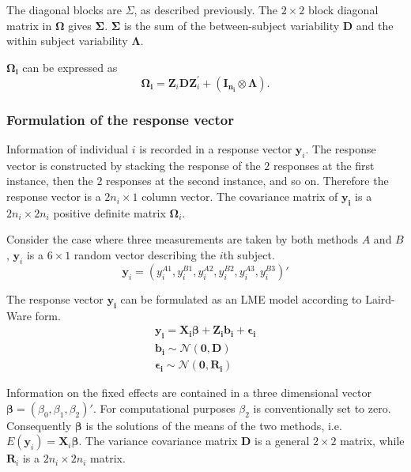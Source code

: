 \documentclass[12pt, a4paper]{report}
\theoremstyle{plain}
\theoremstyle{definition}
\theoremstyle{remark}
\begin{document}
	The diagonal blocks are $\Sigma$, as described previously. The $2 \times 2$ block diagonal matrix in $\boldsymbol{\Omega}$ gives $\boldsymbol{\Sigma}$. $\boldsymbol{\Sigma}$ is the sum of the between-subject variability $\boldsymbol{D}$ and the within subject variability $\boldsymbol{\Lambda}$.
	
	$\boldsymbol{\Omega_{i}}$ can be expressed as
	\[
	\boldsymbol{\Omega_{i}} = \boldsymbol{Z}_{i}\boldsymbol{D}\boldsymbol{Z}_{i}^\prime + ({\boldsymbol{I_{n_{i}}} \otimes \boldsymbol{\Lambda}}).
	\]
	
	
	\subsubsection{Formulation of the response vector}
	Information of individual $i$ is recorded in a response vector $\boldsymbol{y}_{i}$. The response vector is constructed by stacking the response of the $2$ responses at the first instance, then the $2$ responses at the second instance, and so on. Therefore the response vector is a $2n_{i} \times 1$ column vector.
	The covariance matrix of $\boldsymbol{y_{i}}$ is a $2n_{i} \times 2n_{i}$ positive definite matrix $\boldsymbol{\Omega}_{i}$.
	
	Consider the case where three measurements are taken by both methods $A$ and $B$, $\boldsymbol{y}_{i}$ is a $6 \times 1$ random vector describing the $i$th subject.
	\[
	\boldsymbol{y}_{i} = (y_{i}^{A1},y_{i}^{B1},y_{i}^{A2},y_{i}^{B2},y_{i}^{A3},y_{i}^{B3}) \prime
	\]
	
	The response vector $\boldsymbol{y_{i}}$ can be formulated as an LME model according to Laird-Ware form.
	\begin{eqnarray*}
		\boldsymbol{y_{i}} = \boldsymbol{X_{i}\beta}  + \boldsymbol{Z_{i}b_{i}} + \boldsymbol{\epsilon_{i}}\\
		\boldsymbol{b_{i}} \sim \mathcal{N}(\boldsymbol{0,D})\\
		\boldsymbol{\epsilon_{i}} \sim \mathcal{N}(\boldsymbol{0,R_{i}})
	\end{eqnarray*}
	
	Information on the fixed effects are contained in a three dimensional vector $\boldsymbol{\beta} = (\beta_{0},\beta_{1},\beta_{2})\prime$. For computational purposes $\beta_{2}$ is conventionally set to zero. Consequently $\boldsymbol{\beta}$ is the solutions of the means of the two methods, i.e. $E(\boldsymbol{y}_{i})  = \boldsymbol{X}_{i}\boldsymbol{\beta}$. The variance covariance matrix $\boldsymbol{D}$ is a general $2 \times 2$ matrix, while $\boldsymbol{R}_{i}$ is a $2n_{i} \times 2n_{i}$ matrix.
	
\end{document}
